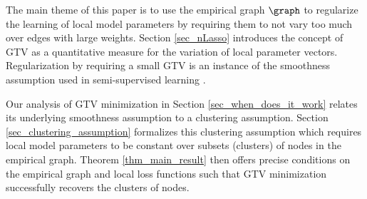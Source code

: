 \documentclass[lettersize,journal]{IEEEtran}
\begin{document}
The main theme of this paper is to use the empirical graph $\graph$ to regularize the learning 
of local model parameters by requiring them to not vary too much over edges with large weights. 
Section \ref{sec_nLasso} introduces the concept of GTV as a quantitative measure for the variation 
of local parameter vectors. Regularization by requiring a small GTV is an instance of the 
smoothness assumption used in semi-supervised learning \cite{SemiSupervisedBook}. 

Our analysis of GTV minimization in Section \ref{sec_when_does_it_work} relates its underlying 
smoothness assumption to a clustering assumption. Section \ref{sec_clustering_assumption} formalizes 
this clustering assumption which requires local model parameters to be constant over subsets (clusters) 
of nodes in the empirical graph. Theorem \ref{thm_main_result} then offers precise conditions on the 
empirical graph and local loss functions such that GTV minimization successfully recovers the clusters 
of nodes.
\end{document}
